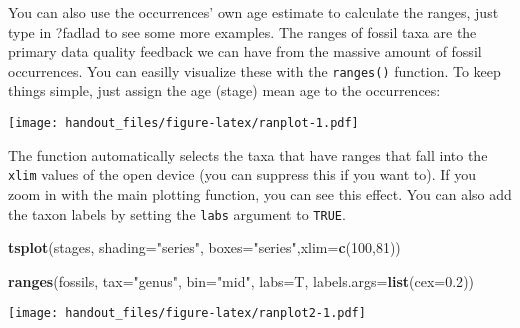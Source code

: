 \documentclass[]{article}
\newenvironment{Shaded}{\begin{snugshade}}{\end{snugshade}}
\newcommand{\KeywordTok}[1]{\textcolor[rgb]{0.13,0.29,0.53}{\textbf{{#1}}}}
\newcommand{\DataTypeTok}[1]{\textcolor[rgb]{0.13,0.29,0.53}{{#1}}}
\newcommand{\DecValTok}[1]{\textcolor[rgb]{0.00,0.00,0.81}{{#1}}}
\newcommand{\FloatTok}[1]{\textcolor[rgb]{0.00,0.00,0.81}{{#1}}}
\newcommand{\StringTok}[1]{\textcolor[rgb]{0.31,0.60,0.02}{{#1}}}
\newcommand{\NormalTok}[1]{{#1}}
\begin{document}
You can also use the occurrences' own age estimate to calculate the
ranges, just type in ?fadlad to see some more examples. The ranges of
fossil taxa are the primary data quality feedback we can have from the
massive amount of fossil occurrences. You can easilly visualize these
with the \texttt{ranges()} function. To keep things simple, just assign
the age (stage) mean age to the occurrences:

\begin{Shaded}
\end{Shaded}

\texttt{[image: handout\_files/figure-latex/ranplot-1.pdf]}

The function automatically selects the taxa that have ranges that fall
into the \texttt{xlim} values of the open device (you can suppress this
if you want to). If you zoom in with the main plotting function, you can
see this effect. You can also add the taxon labels by setting the
\texttt{labs} argument to \texttt{TRUE}.

\begin{Shaded}
\begin{Highlighting}[]
\KeywordTok{tsplot}\NormalTok{(stages, }\DataTypeTok{shading=}\StringTok{"series"}\NormalTok{, }\DataTypeTok{boxes=}\StringTok{"series"}\NormalTok{,}\DataTypeTok{xlim=}\KeywordTok{c}\NormalTok{(}\DecValTok{100}\NormalTok{,}\DecValTok{81}\NormalTok{))}

\KeywordTok{ranges}\NormalTok{(fossils, }\DataTypeTok{tax=}\StringTok{"genus"}\NormalTok{, }\DataTypeTok{bin=}\StringTok{"mid"}\NormalTok{, }\DataTypeTok{labs=}\NormalTok{T, }\DataTypeTok{labels.args=}\KeywordTok{list}\NormalTok{(}\DataTypeTok{cex=}\FloatTok{0.2}\NormalTok{))}
\end{Highlighting}
\end{Shaded}

\texttt{[image: handout\_files/figure-latex/ranplot2-1.pdf]}
\end{document}
